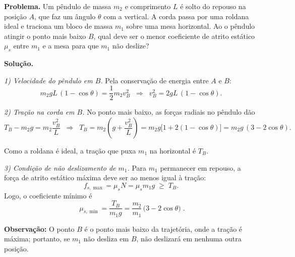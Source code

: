 \documentclass[a4paper,12pt]{article}
\newcommand{\printingbibliography}{%

    \pagestyle{myheadings}
    \markright{}
    \sloppy
    \printbibliography[heading=bibintoc, %
                   title=Refer\^encias %
                  ]
    \fussy%
}
\begin{document}
\begin{flushleft}
\textbf{Problema.} Um pêndulo de massa $m_2$ e comprimento $L$ é solto do repouso na posição $A$, que faz um ângulo $\theta$ com a vertical. A corda passa por uma roldana ideal e traciona um bloco de massa $m_1$ sobre uma mesa horizontal. Ao o pêndulo atingir o ponto mais baixo $B$, qual deve ser o menor coeficiente de atrito estático $\mu_s$ entre $m_1$ e a mesa para que $m_1$ não deslize?

\vspace{0.4cm}
\textbf{Solução.}

\textit{1) Velocidade do pêndulo em $B$.} Pela conservação de energia entre $A$ e $B$:
\[
m_2 g L\,(1-\cos\theta)=\frac12 m_2 v_B^2
\;\;\Rightarrow\;\;
v_B^2=2gL\,(1-\cos\theta).
\]

\textit{2) Tração na corda em $B$.} No ponto mais baixo, as forças radiais no pêndulo dão
\[
T_B - m_2 g = m_2\frac{v_B^2}{L}
\;\;\Rightarrow\;\;
T_B = m_2\!\left(g+\frac{v_B^2}{L}\right)
     = m_2 g\bigl[1+2(1-\cos\theta)\bigr]
     = m_2 g\,(3-2\cos\theta).
\]

Como a roldana é ideal, a tração que puxa $m_1$ na horizontal é $T_B$.

\textit{3) Condição de não deslizamento de $m_1$.} Para $m_1$ permanecer em repouso,
a força de atrito estático máxima deve ser ao menos igual à tração:
\[
f_{s,\max}=\mu_s N=\mu_s m_1 g \;\ge\; T_B.
\]
Logo, o coeficiente mínimo é
\[
\boxed{\;\mu_{s,\min}=\frac{T_B}{m_1 g}
      =\frac{m_2}{m_1}\,\bigl(3-2\cos\theta\bigr)\; }.
\]

\textbf{Observação:} O ponto $B$ é o ponto mais baixo da trajetória, onde a tração é máxima; portanto, se $m_1$ não desliza em $B$, não deslizará em nenhuma outra posição.
\end{flushleft}




\end{document}
